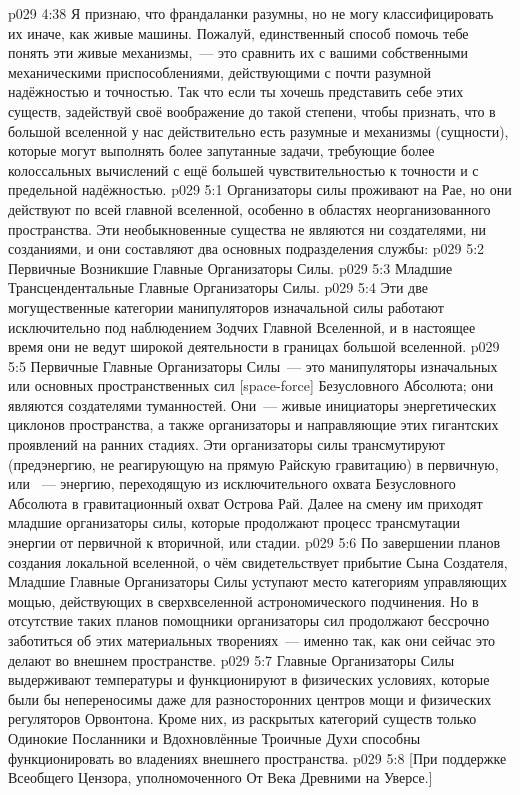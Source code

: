 \vs p029 4:38 Я признаю, что франдаланки разумны, но не могу классифицировать их иначе, как живые машины. Пожалуй, единственный способ помочь тебе понять эти живые механизмы,~--- это сравнить их с вашими собственными механическими приспособлениями, действующими с почти разумной надёжностью и точностью. Так что если ты хочешь представить себе этих существ, задействуй своё воображение до такой степени, чтобы признать, что в большой вселенной у нас действительно есть разумные и  механизмы (сущности), которые могут выполнять более запутанные задачи, требующие более колоссальных вычислений с ещё большей чувствительностью к точности и с предельной надёжностью.
\vs p029 5:1 Организаторы силы проживают на Рае, но они действуют по всей главной вселенной, особенно в областях неорганизованного пространства. Эти необыкновенные существа не являются ни создателями, ни созданиями, и они составляют два основных подразделения службы:
\vs p029 5:2 Первичные Возникшие Главные Организаторы Силы.
\vs p029 5:3 Младшие Трансцендентальные Главные Организаторы Силы.
\vs p029 5:4 \pc Эти две могущественные категории манипуляторов изначальной силы работают исключительно под наблюдением Зодчих Главной Вселенной, и в настоящее время они не ведут широкой деятельности в границах большой вселенной.
\vs p029 5:5 \pc Первичные Главные Организаторы Силы~--- это манипуляторы изначальных или основных пространственных сил [space\hyp{}force] Безусловного Абсолюта; они являются создателями туманностей. Они~--- живые инициаторы энергетических циклонов пространства, а также организаторы и направляющие этих гигантских проявлений на ранних стадиях. Эти организаторы силы трансмутируют  (предэнергию, не реагирующую на прямую Райскую гравитацию) в первичную, или ~--- энергию, переходящую из исключительного охвата Безусловного Абсолюта в гравитационный охват Острова Рай. Далее на смену им приходят младшие организаторы силы, которые продолжают процесс трансмутации энергии от первичной к вторичной, или  стадии.
\vs p029 5:6 По завершении планов создания локальной вселенной, о чём свидетельствует прибытие Сына Создателя, Младшие Главные Организаторы Силы уступают место категориям управляющих мощью, действующих в сверхвселенной астрономического подчинения. Но в отсутствие таких планов помощники организаторы сил продолжают бессрочно заботиться об этих материальных творениях~--- именно так, как они сейчас это делают во внешнем пространстве.
\vs p029 5:7 Главные Организаторы Силы выдерживают температуры и функционируют в физических условиях, которые были бы непереносимы даже для разносторонних центров мощи и физических регуляторов Орвонтона. Кроме них, из раскрытых категорий существ только Одинокие Посланники и Вдохновлённые Троичные Духи способны функционировать во владениях внешнего пространства.
\vsetoff
\vs p029 5:8 [При поддержке Всеобщего Цензора, уполномоченного От Века Древними на Уверсе.]
\quizlink
